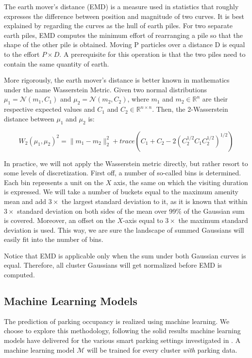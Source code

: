 The earth mover's distance (EMD) is a measure used in statistics that roughly expresses the difference between position and magnitude of two curves.
It is best explained by regarding the curves as the hull of earth piles.
For two separate earth piles, EMD computes the minimum effort of rearranging a pile so that the shape of the other pile is obtained.
Moving P particles over a distance D is equal to the effort $P \times D$.
A prerequisite for this operation is that the two piles need to contain the same quantity of earth.

More rigorously, the earth mover's distance is better known in mathematics under the name Wasserstein Metric.
Given two normal distributions $\mu_1=\mathcal{N}(m_1,C_1)$ and $\mu_2=\mathcal{N}(m_2,C_2)$, where $m_1$ and $m_2 \in \mathbb{R}^{n}$ are their respective expected values and $C_1$ and $C_2 \in \mathbb{R}^{n\times n}$.
Then, the 2-Wasserstein distance between $\mu_1$ and $\mu_2$ is:

\begin{equation}
W_2(\mu_1,\mu_2)^2={\lVert}m_1-m_2{\rVert}^2_2+trace(C_1+C_2-2(C_2^{1/2}C_1C_2^{1/2})^{1/2})
\end{equation}

In practice, we will not apply the Wasserstein metric directly, but rather resort to some levels of discretization.
First off, a number of so-called bins is determined.
Each bin represents a unit on the $X$ axis, the same on which the visiting duration is expressed.
We will take a number of buckets equal to the maximum amenity mean and add $3\times$ the largest standard deviation to it, as it is known that within $3\times$ standard deviation on both sides of the mean over 99\% of the Gaussian sum is covered.
Moreover, an offset on the $X$-axis equal to $3\times$ the maximum standard deviation is used.
This way, we are sure the landscape of summed Gaussians will easily fit into the number of bins.

Notice that EMD is applicable only when the sum under both Gaussian curves is equal.
Therefore, all cluster Gaussians will get normalized before EMD is computed.

\subsection{Machine Learning Models}
\label{realization:machine_learning_models}
The prediction of parking occupancy is realized using machine learning.
We choose to explore this methodology, following the solid results machine learning models have delivered for the various smart parking settings investigated in . A machine learning model $\mathcal{M}$ will be trained for every cluster \textit{with} parking data.

